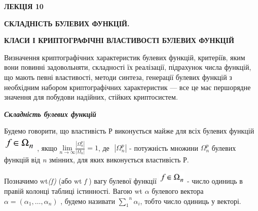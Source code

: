 \bigskip


\bigskip


\bigskip


\bigskip


\bigskip


\bigskip


\bigskip


\bigskip

{\bfseries
ЛЕКЦІЯ  10}


\bigskip

{\centering\bfseries
СКЛАДНІСТЬ БУЛЕВИХ ФУНКЦІЙ.
\par}

{\centering\bfseries
КЛАСИ  І  КРИПТОГРАФІЧНІ ВЛАСТИВОСТІ БУЛЕВИХ ФУНКЦІЙ
\par}


\bigskip


\bigskip

Визначення криптографічних характеристик булевих функцій, критеріїв, яким вони
повинні задовольняти, складності їх реалізації,  підрахунок  числа функцій, що
мають певні властивості, методи синтеза, генерації булевих функцій з необхідним
набором криптографічних характеристик --- все це має першорядне значення для
побудови надійних, стійких криптосистем.


\bigskip


\bigskip

{\centering\bfseries\itshape
Складність булевих функцій
\par}


\bigskip


\bigskip

Будемо говорити, що властивість Р виконується майже для всіх булевих функцій 
\includegraphics[width=0.6311in,height=0.2972in]{crypt-img/crypt-img169.png} ,
якщо  ${\underset{n\rightarrow \infty }{\text{lim}}\frac{|\Omega
_{n}^{p}|}{|\Omega _{n}|}=1}$, де  $ $ $|\Omega _{n}^p|$ -
потужність множини  $\Omega _{n}^p$ булевих функцій від \textit{n}
змінних, для яких виконується властивість Р.

Позначимо wt\textit{(}\textit{f}\textit{)} (або  wt \textit{f}\textit{ 
})\textit{  }вагу булевої  функції 
\includegraphics[width=0.528in,height=0.25in]{crypt-img/crypt-img170.png}  -
число одиниць в правій колонці таблиці істинності. Вагою wt $\alpha $
булевого вектора  ${\alpha =(\alpha _{1},\dots,\alpha
_{n})}$ , будемо називати  ${\overset{n}{\underset{1}{\sum }}{\alpha
_{i}}}$, тобто число одиниць у векторі.

